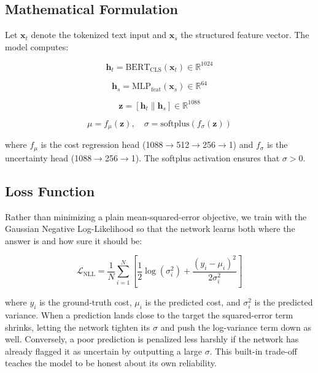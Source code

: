 \documentclass[conference]{IEEEtran}
\begin{document}
\subsection{Mathematical Formulation}

Let $\mathbf{x}_t$ denote the tokenized text input and $\mathbf{x}_s$ the structured feature vector. The model computes:

\begin{equation}
    \mathbf{h}_t = \text{BERT}_{\text{CLS}}(\mathbf{x}_t) \in \mathbb{R}^{1024}
\end{equation}

\begin{equation}
    \mathbf{h}_s = \text{MLP}_{\text{feat}}(\mathbf{x}_s) \in \mathbb{R}^{64}
\end{equation}

\begin{equation}
    \mathbf{z} = [\mathbf{h}_t \| \mathbf{h}_s] \in \mathbb{R}^{1088}
\end{equation}

\begin{equation}
    \mu = f_\mu(\mathbf{z}), \quad \sigma = \text{softplus}(f_\sigma(\mathbf{z}))
\end{equation}

\noindent where $f_\mu$ is the cost regression head (1088$\rightarrow$512$\rightarrow$256$\rightarrow$1) and $f_\sigma$ is the uncertainty head (1088$\rightarrow$256$\rightarrow$1). The softplus activation ensures that $\sigma > 0$.

\subsection{Loss Function}

Rather than minimizing a plain mean-squared-error objective, we train with the Gaussian Negative Log-Likelihood so that the network learns both where the answer is and how sure it should be:

\begin{equation}
    \mathcal{L}_{\text{NLL}} = \frac{1}{N}\sum_{i=1}^{N}\left[\frac{1}{2}\log(\sigma_i^2) + \frac{(y_i - \mu_i)^2}{2\sigma_i^2}\right]
\end{equation}

\noindent where $y_i$ is the ground-truth cost, $\mu_i$ is the predicted cost, and $\sigma_i^2$ is the predicted variance. When a prediction lands close to the target the squared-error term shrinks, letting the network tighten its $\sigma$ and push the log-variance term down as well. Conversely, a poor prediction is penalized less harshly if the network has already flagged it as uncertain by outputting a large $\sigma$. This built-in trade-off teaches the model to be honest about its own reliability.
\end{document}
